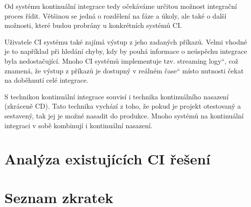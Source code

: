 \documentclass[thesis=B,czech]{template/FITthesisXE}
\newcommand{\uv}[1]{\quotedblbase #1\textquotedblleft}
\begin{document}
Od systému kontinuální integrace tedy očekáváme určitou možnost integrační proces řídit.
Většinou se jedná o rozdělení na fáze a úkoly, ale také o další možnosti, které budou probrány u konkrétních systémů CI.

Uživatele CI systému také zajímá výstup z jeho zadaných příkazů.
Velmi vhodné je to například při hledání chyby, kdy by pouhá informace o neúspěchu integrace byla nedostačující.
Mnoho CI systémů implementuje tzv. \uv{streaming logy}, což znamená, že výstup z příkazů je dostupný v \uv{reálném čase} místo nutnosti čekat na doběhnutí celé integrace.

S technikou kontinuální integrace souvisí i technika kontinuálního nasazení (zkráceně CD).
Tato technika vychází z toho, že pokud je projekt otestovaný a sestavený, tak jej je možné nasadit do produkce.
Mnoho systémů na kontinuální integraci v sobě kombinují i kontinuální nasazení.




\chapter{Analýza existujících CI řešení}








\printbibliography[]


\appendix

\chapter{Seznam zkratek}
\printglossary[type=\acronymtype,style=acronyms]



\end{document}
